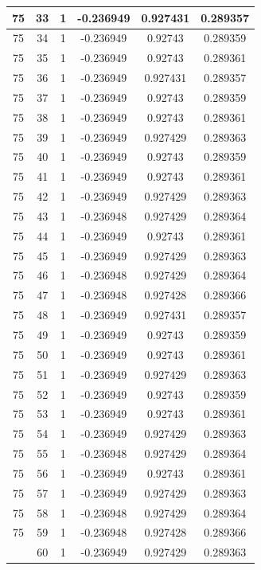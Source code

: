 \documentclass[12pt,a4paper]{article}
\numberwithin{equation}{section}
\numberwithin{figure}{section}
\numberwithin{table}{section}
\begin{document}
\begin{longtable}{|c|c|c|c|c|c|}
75 & 33 & 1 & -0.236949 & 0.927431 & 0.289357 \\ \hline
75 & 34 & 1 & -0.236949 & 0.92743 & 0.289359 \\ \hline
75 & 35 & 1 & -0.236949 & 0.92743 & 0.289361 \\ \hline
75 & 36 & 1 & -0.236949 & 0.927431 & 0.289357 \\ \hline
75 & 37 & 1 & -0.236949 & 0.92743 & 0.289359 \\ \hline
75 & 38 & 1 & -0.236949 & 0.92743 & 0.289361 \\ \hline
75 & 39 & 1 & -0.236949 & 0.927429 & 0.289363 \\ \hline
75 & 40 & 1 & -0.236949 & 0.92743 & 0.289359 \\ \hline
75 & 41 & 1 & -0.236949 & 0.92743 & 0.289361 \\ \hline
75 & 42 & 1 & -0.236949 & 0.927429 & 0.289363 \\ \hline
75 & 43 & 1 & -0.236948 & 0.927429 & 0.289364 \\ \hline
75 & 44 & 1 & -0.236949 & 0.92743 & 0.289361 \\ \hline
75 & 45 & 1 & -0.236949 & 0.927429 & 0.289363 \\ \hline
75 & 46 & 1 & -0.236948 & 0.927429 & 0.289364 \\ \hline
75 & 47 & 1 & -0.236948 & 0.927428 & 0.289366 \\ \hline
75 & 48 & 1 & -0.236949 & 0.927431 & 0.289357 \\ \hline
75 & 49 & 1 & -0.236949 & 0.92743 & 0.289359 \\ \hline
75 & 50 & 1 & -0.236949 & 0.92743 & 0.289361 \\ \hline
75 & 51 & 1 & -0.236949 & 0.927429 & 0.289363 \\ \hline
75 & 52 & 1 & -0.236949 & 0.92743 & 0.289359 \\ \hline
75 & 53 & 1 & -0.236949 & 0.92743 & 0.289361 \\ \hline
75 & 54 & 1 & -0.236949 & 0.927429 & 0.289363 \\ \hline
75 & 55 & 1 & -0.236948 & 0.927429 & 0.289364 \\ \hline
75 & 56 & 1 & -0.236949 & 0.92743 & 0.289361 \\ \hline
75 & 57 & 1 & -0.236949 & 0.927429 & 0.289363 \\ \hline
75 & 58 & 1 & -0.236948 & 0.927429 & 0.289364 \\ \hline
75 & 59 & 1 & -0.236948 & 0.927428 & 0.289366 \\ \hline
\pagebreak
75 & 60 & 1 & -0.236949 & 0.927429 & 0.289363 \\ \hline

\end{longtable}
\end{document}
